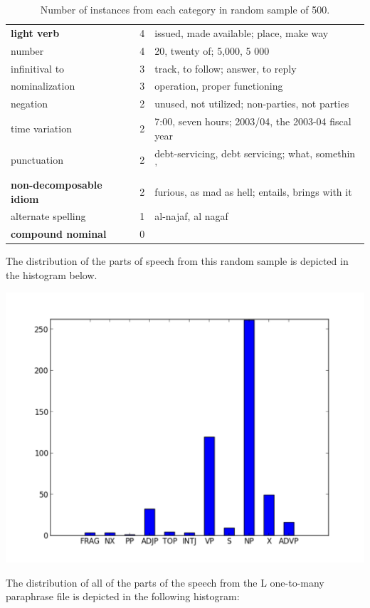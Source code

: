 \documentclass[11pt]{article}
\begin{document}
\begin{table}[h]
\begin{center}
\begin{tabular}{|l|r|l|}
\bf light verb & 4  &  issued, made available; place, make way \\
number & 4 & 20, twenty of; 5,000, 5 000\\
infinitival to & 3 & track, to follow; answer, to reply \\
nominalization & 3 &  operation, proper functioning \\
negation & 2 & unused, not utilized; non-parties, not parties  \\
time variation & 2 & 7:00, seven hours; 2003/04, the 2003-04 fiscal year\\
punctuation & 2 & debt-servicing, debt servicing; what, somethin '\\
\bf non-decomposable idiom & 2 & furious, as mad as hell; entails, brings with it\\
alternate spelling & 1 & al-najaf, al nagaf\\
\bf compound nominal & 0 &\\
\hline
\end{tabular}
\end{center}
\caption{\label{font-table} Number of instances from each category in random sample of 500. }
\end{table}

The distribution of the parts of speech from this random sample is depicted in the histogram below. 

\begin{center}
\includegraphics[width=150mm]{figs/random_sample_pos_histogram_500.pdf}
\end{center}

The distribution of all of the parts of the speech from the L one-to-many paraphrase file is depicted in the following histogram:
\end{document}

